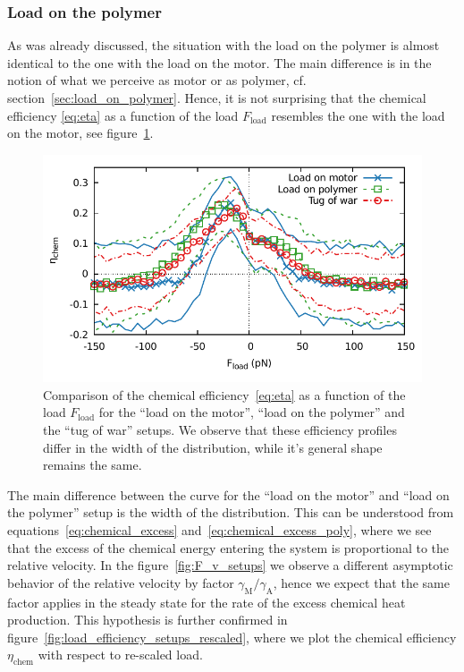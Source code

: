 \documentclass[aps,pre,twocolumn,showpacs,showkeys,superscriptaddress,floatfix]{revtex4-1}
\begin{document}
\subsubsection{Load on the polymer}
As was already discussed, the situation with the load on the polymer is almost identical to the one with the load on the motor.
The main difference is in the notion of what we perceive as motor or as polymer, cf. section~\ref{sec:load_on_polymer}.
Hence, it is not surprising that the chemical efficiency \eqref{eq:eta} as a function of the load $F_\text{load}$ 
resembles the one with the load on the motor, see figure~\ref{fig:load_efficiency_setups}. 
\begin{figure}[t]
\centering
\includegraphics[width=.45\textwidth,height=!]{F_eta_setup.pdf}
\caption{\label{fig:load_efficiency_setups}
Comparison of the chemical efficiency~\eqref{eq:eta} as a function of the load $F_\text{load}$ for the ``load on the motor'', ``load on the polymer'' and the ``tug of war'' setups.
We observe that these efficiency profiles differ in the width of the distribution, while it's general shape remains the same.   
}
\end{figure}
The main difference between the curve for the ``load on the motor'' and ``load on the polymer'' setup is the width of the distribution. 
This can be understood from equations~\eqref{eq:chemical_excess} and~\eqref{eq:chemical_excess_poly}, 
where we see that the excess of the chemical energy entering the system is proportional to the relative velocity.
In the figure~\ref{fig:F_v_setups} we observe a different asymptotic behavior of the relative velocity by factor $\gamma_\text{M} / \gamma_\text{A}$,
hence we expect that the same factor applies in the steady state for the rate of the excess chemical heat production. 
This hypothesis is further confirmed in figure~\ref{fig:load_efficiency_setups_rescaled},
where we plot the chemical efficiency $\eta_\text{chem}$ with respect to re-scaled load. 
\end{document}
